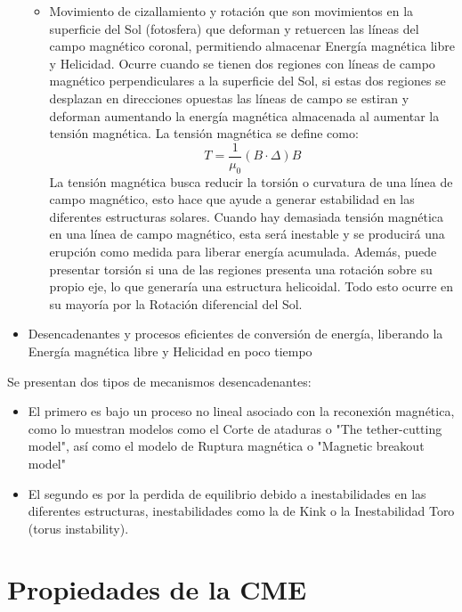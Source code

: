 \begin{itemize}
\begin{itemize}
    \item Movimiento de cizallamiento y rotación que son movimientos en la superficie del Sol (fotosfera) que deforman y retuercen las líneas del campo magnético coronal, permitiendo almacenar Energía magnética libre y Helicidad. Ocurre cuando se tienen dos regiones con líneas de campo magnético perpendiculares a la superficie del Sol, si estas dos regiones se desplazan en direcciones opuestas las líneas de campo se estiran y deforman aumentando la energía magnética almacenada al aumentar la tensión magnética. 
    La tensión magnética se define como:
    \begin{equation}
        T=\frac{1}{\mu_{0}}(B\cdot \Delta)B
    \end{equation}
La tensión magnética busca reducir la torsión o curvatura de una línea de campo magnético, esto hace que ayude a generar estabilidad en las diferentes estructuras solares. Cuando hay demasiada tensión magnética en una línea de campo magnético, esta será inestable y se producirá una erupción como medida para liberar energía acumulada.
Además, puede presentar torsión si una de las regiones presenta una rotación sobre su propio eje, lo que generaría una estructura helicoidal. Todo esto ocurre en su mayoría por la Rotación diferencial del Sol.
    \end{itemize}
\item Desencadenantes y procesos eficientes de conversión de energía, liberando la Energía magnética libre y Helicidad en poco tiempo
\end{itemize}


Se presentan dos tipos de mecanismos desencadenantes:
\begin{itemize}
    \item El primero es bajo un proceso no lineal asociado con la reconexión magnética, como lo muestran modelos como el Corte de ataduras o "The tether-cutting model", así como el modelo de Ruptura magnética o "Magnetic breakout model"
\item El segundo es por la perdida de equilibrio debido a inestabilidades en las diferentes estructuras, inestabilidades como la de Kink o la Inestabilidad Toro (torus instability).
\end{itemize}


\section{Propiedades de la CME}

